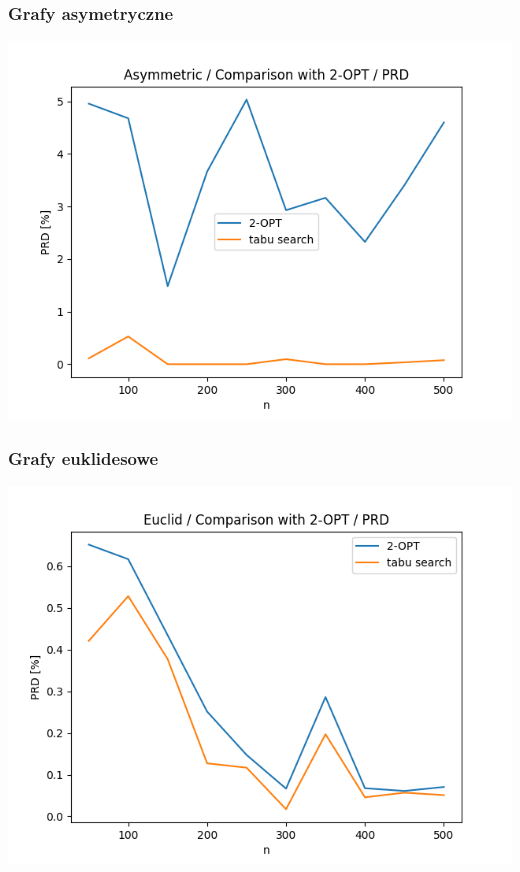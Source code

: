 \documentclass{article}
\begin{document}
\subsubsection{Grafy asymetryczne}

\begin{center}
\includegraphics[width=\textwidth, 
                   height = 0.4\textheight, 
                   keepaspectratio]
                  {plots/two_opt_asymmetric_prd} 
\end{center}


\subsubsection{Grafy euklidesowe}

\begin{center}
\includegraphics[width=\textwidth, 
                   height = 0.4\textheight, 
                   keepaspectratio]
                  {plots/two_opt_euclid_prd} 
\end{center}
\end{document}
